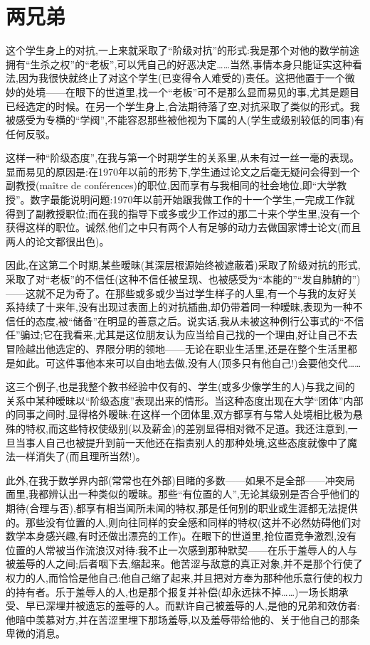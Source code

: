 \section{两兄弟}

这个学生身上的对抗,一上来就采取了“阶级对抗”的形式:我是那个对他的数学前途拥有“生杀之权”的“老板”,可以凭自己的好恶决定……当然,事情本身只能证实这种看法,因为我很快就终止了对这个学生(已变得令人难受的)责任。这把他置于一个微妙的处境——在眼下的世道里,找一个“老板”可不是那么显而易见的事,尤其是题目已经选定的时候。在另一个学生身上,合法期待落了空,对抗采取了类似的形式。我被感受为专横的“学阀”,不能容忍那些被他视为下属的人(学生或级别较低的同事)有任何反驳。

这样一种“阶级态度”,在我与第一个时期学生的关系里,从未有过一丝一毫的表现。显而易见的原因是:在1970年以前的形势下,学生通过论文之后毫无疑问会得到一个副教授(maître de conférences)的职位,因而享有与我相同的社会地位,即“大学教授”。数字最能说明问题:1970年以前开始跟我做工作的十一个学生,一完成工作就得到了副教授职位;而在我的指导下或多或少工作过的那二十来个学生里,没有一个获得这样的职位。诚然,他们之中只有两个人有足够的动力去做国家博士论文(而且两人的论文都很出色)。

因此,在这第二个时期,某些暧昧(其深层根源始终被遮蔽着)采取了阶级对抗的形式,采取了对“老板”的不信任(这种不信任被呈现、也被感受为“本能的”“发自肺腑的”)——这就不足为奇了。在那些或多或少当过学生样子的人里,有一个与我的友好关系持续了十来年,没有出现过表面上的对抗插曲,却仍带着同一种暧昧,表现为一种不信任的态度,被“储备”在明显的善意之后。说实话,我从未被这种例行公事式的“不信任”骗过;它在我看来,尤其是这位朋友认为应当给自己找的一个理由,好让自己不去冒险越出他选定的、界限分明的领地——无论在职业生活里,还是在整个生活里都是如此。可这件事他本来可以自由地去做,没有人(顶多只有他自己!)会要他交代……

这三个例子,也是我整个教书经验中仅有的、学生(或多少像学生的人)与我之间的关系中某种暧昧以“阶级态度”表现出来的情形。当这种态度出现在大学“团体”内部的同事之间时,显得格外暧昧:在这样一个团体里,双方都享有与常人处境相比极为悬殊的特权,而这些特权使级别(以及薪金)的差别显得相对微不足道。我还注意到,一旦当事人自己也被提升到前一天他还在指责别人的那种处境,这些态度就像中了魔法一样消失了(而且理所当然!)。

此外,在我于数学界内部(常常也在外部)目睹的多数——如果不是全部——冲突局面里,我都辨认出一种类似的暧昧。那些“有位置的人”,无论其级别是否合乎他们的期待(合理与否),都享有相当闻所未闻的特权,那是任何别的职业或生涯都无法提供的。那些没有位置的人,则向往同样的安全感和同样的特权(这并不必然妨碍他们对数学本身感兴趣,有时还做出漂亮的工作)。在眼下的世道里,抢位置竞争激烈,没有位置的人常被当作流浪汉对待:我不止一次感到那种默契——在乐于羞辱人的人与被羞辱的人之间;后者咽下去,缩起来。他苦涩与敌意的真正对象,并不是那个行使了权力的人,而恰恰是他自己:他自己缩了起来,并且把对方奉为那种他乐意行使的权力的持有者。乐于羞辱人的人,也是那个报复并补偿(却永远抹不掉……)一场长期承受、早已深埋并被遗忘的羞辱的人。而默许自己被羞辱的人,是他的兄弟和效仿者:他暗中羡慕对方,并在苦涩里埋下那场羞辱,以及羞辱带给他的、关于他自己的那条卑微的消息。

